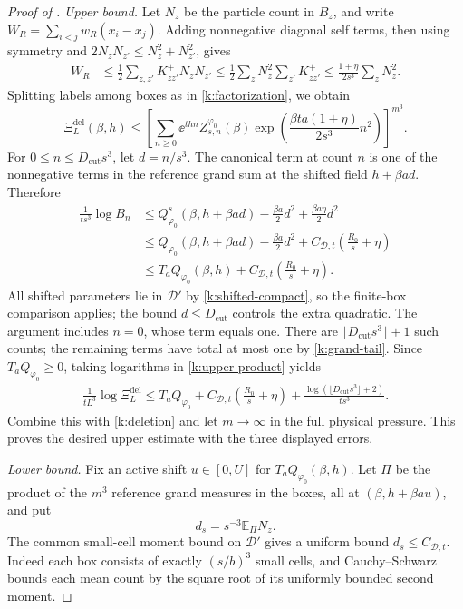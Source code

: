 \begin{proof}[Proof of ]
\medskip\noindent\emph{Upper bound.}
Let $N_z$ be the particle count in $B_z$, and write
$W_R=\sum_{i<j}w_R(x_i-x_j)$.  Adding nonnegative diagonal self terms,
then using symmetry and $2N_zN_{z'}\le N_z^2+N_{z'}^2$, gives
\begin{align*}
 W_R
 &\le\frac12\sum_{z,z'}K^+_{zz'}N_zN_{z'}
 \le\frac12\sum_zN_z^2\sum_{z'}K^+_{zz'}
 \le\frac{1+\eta}{2s^3}\sum_zN_z^2.
\end{align*}
Splitting labels among boxes as in \eqref{k:factorization}, we obtain
\begin{equation}
 \Xi_L^{\mathrm{del}}(\beta,h)
 \le\left[\sum_{n\ge0}
 \ee^{thn}Z^{\varphi_0}_{s,n}(\beta)
 \exp\!\left(\frac{\beta ta(1+\eta)}{2s^3}n^2\right)
 \right]^{m^3}.
 \label{k:upper-product}
\end{equation}
For $0\le n\le D_{\mathrm{cut}}s^3$, let $d=n/s^3$.  The canonical term at count
$n$ is one of the nonnegative terms in the reference grand sum at the
shifted field $h+\beta ad$.  Therefore
\begin{align*}
 \frac1{ts^3}\log B_n
 &\le Q^s_{\varphi_0}(\beta,h+\beta ad)
                     -\frac{\beta a}{2}d^2
                     +\frac{\beta a\eta}{2}d^2\\
 &\le Q_{\varphi_0}(\beta,h+\beta ad)
                     -\frac{\beta a}{2}d^2
                     +C_{\mathcal D,t}\left(\frac{R_0}{s}+\eta\right)\\
 &\le T_aQ_{\varphi_0}(\beta,h)
                     +C_{\mathcal D,t}\left(\frac{R_0}{s}+\eta\right).
\end{align*}
All shifted parameters lie in $\mathcal D'$ by
\eqref{k:shifted-compact}, so the finite-box comparison applies; the bound
$d\le D_{\mathrm{cut}}$ controls the extra quadratic.  The argument includes $n=0$,
whose term equals one.  There are $\lfloor D_{\mathrm{cut}}s^3\rfloor+1$ such
counts; the remaining terms have total at most one by
\eqref{k:grand-tail}.  Since $T_aQ_{\varphi_0}\ge0$, taking logarithms
in \eqref{k:upper-product} yields
\begin{align}
 \frac1{tL^3}\log\Xi_L^{\mathrm{del}}
 \le T_aQ_{\varphi_0}
 +C_{\mathcal D,t}\left(\frac{R_0}{s}+\eta\right)
 +\frac{\log(\lfloor D_{\mathrm{cut}}s^3\rfloor+2)}{ts^3}.
 \label{k:upper-final}
\end{align}
Combine this with \eqref{k:deletion} and let $m\to\infty$ in the
full physical pressure.  This proves the desired upper estimate with
the three displayed errors.

\medskip\noindent\emph{Lower bound.}
Fix an active shift $u\in[0,U]$ for $T_aQ_{\varphi_0}(\beta,h)$.
Let $\Pi$ be the product of the $m^3$ reference grand measures in the
boxes, all at $(\beta,h+\beta au)$, and put
\[
 d_s=s^{-3}\mathbb E_\Pi N_z.
\]
The common small-cell moment bound on $\mathcal D'$ gives a uniform
bound $d_s\le C_{\mathcal D,t}$.  Indeed each box consists of exactly
$(s/b)^3$ small cells, and Cauchy--Schwarz bounds each mean count by the
square root of its uniformly bounded second moment.


\end{proof}
